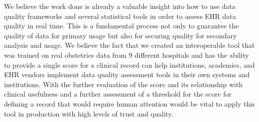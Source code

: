 We believe the work done is already a valuable insight into how to use data quality frameworks and several statistical tools in order to assess EHR data quality in real time. This is a fundamental process not only to guarantee the quality of data for primary usage but also for securing quality for secondary analysis and usage. We believe the fact that we created an interoperable tool that was trained on real obstetrics data from 9 different hospitals and has the ability to provide a single score for a clinical record can help institutions, academics, and EHR vendors implement data quality assessment tools in their own systems and institutions. With the further evaluation of the score and its relationship with clinical usefulness and a further assessment of a threshold for the score for defining a record that would require human attention would be vital to apply this tool in production with high levels of trust and quality.